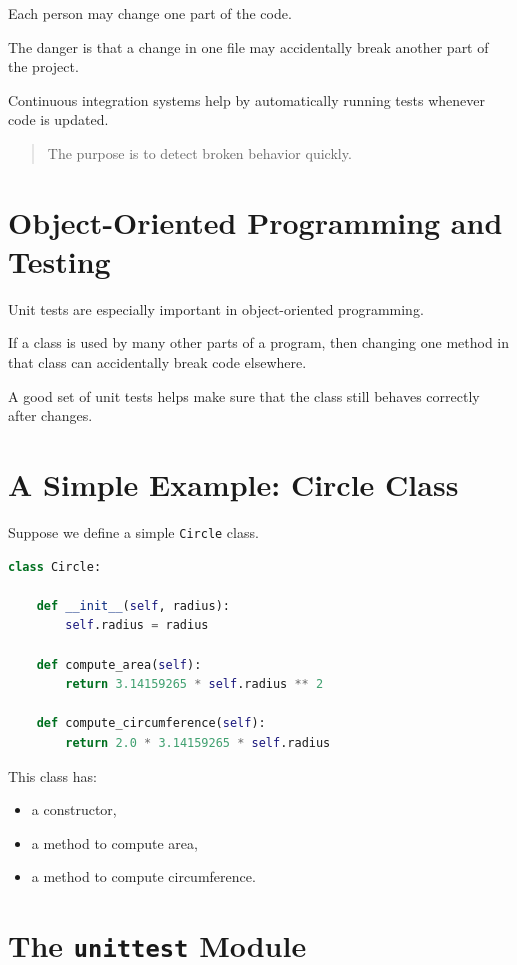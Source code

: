 \documentclass[11pt]{article}
\begin{document}
Each person may change one part of the code.

The danger is that a change in one file may accidentally break another part of the project.

Continuous integration systems help by automatically running tests whenever code is updated.

\begin{quote}
The purpose is to detect broken behavior quickly.
\end{quote}

\section{Object-Oriented Programming and Testing}

Unit tests are especially important in object-oriented programming.

If a class is used by many other parts of a program, then changing one method in that class can accidentally break code elsewhere.

A good set of unit tests helps make sure that the class still behaves correctly after changes.

\section{A Simple Example: Circle Class}

Suppose we define a simple \texttt{Circle} class.

\begin{lstlisting}[language=Python]
class Circle:

    def __init__(self, radius):
        self.radius = radius

    def compute_area(self):
        return 3.14159265 * self.radius ** 2

    def compute_circumference(self):
        return 2.0 * 3.14159265 * self.radius
\end{lstlisting}

This class has:

\begin{itemize}
    \item a constructor,
    \item a method to compute area,
    \item a method to compute circumference.
\end{itemize}

\section{The \texttt{unittest} Module}
\end{document}
